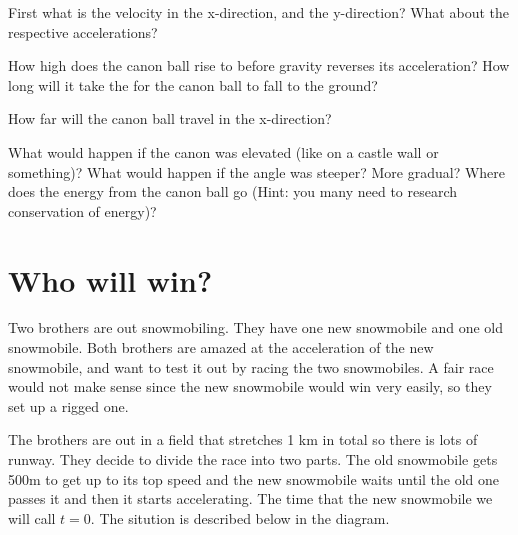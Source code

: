 \documentclass[12pt]{article}
\begin{document}
First what is the velocity in the x-direction, and the y-direction? What about the respective accelerations?

\parbox[][12cm][t]{8cm}{}

How high does the canon ball rise to before gravity reverses its acceleration? How long will it take the for the canon ball to fall to the ground?

\newpage

How far will the canon ball travel in the x-direction?

\parbox[][6cm][t]{8cm}{}

What would happen if the canon was elevated (like on a castle wall or something)? What would happen if the angle was steeper? More gradual? Where does the energy from the canon ball go (Hint: you many need to research conservation of energy)?

\parbox[][12cm][t]{8cm}{}

\section{Who will win?}
Two brothers are out snowmobiling. They have one new snowmobile and one old snowmobile. Both brothers are amazed at the acceleration of the new snowmobile, and want to test it out by racing the two snowmobiles. A fair race would not make sense since the new snowmobile would win very easily, so they set up a rigged one.

The brothers are out in a field that stretches 1 km in total so there is lots of runway. They decide to divide the race into two parts. The old snowmobile gets 500m to get up to its top speed and the new snowmobile waits until the old one passes it and then it starts accelerating. The time that the new snowmobile we will call $t=0$. The sitution is described below in the diagram.
\end{document}
